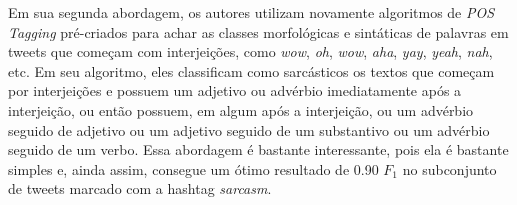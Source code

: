 Em sua segunda abordagem, os autores utilizam novamente algoritmos de
\textit{POS Tagging} pré-criados para achar as classes morfológicas e sintáticas
de palavras em tweets que começam com interjeições, como \textit{wow},
\textit{oh}, \textit{wow}, \textit{aha}, \textit{yay}, \textit{yeah},
\textit{nah}, etc. Em seu algoritmo, eles classificam como sarcásticos os textos
que começam por interjeições e possuem um adjetivo ou advérbio imediatamente
após a interjeição, ou então possuem, em algum após a interjeição, ou um
advérbio seguido de adjetivo ou um adjetivo seguido de um substantivo ou um
advérbio seguido de um verbo. Essa abordagem é bastante interessante, pois ela é
bastante simples e, ainda assim, consegue um ótimo resultado de 0.90 $F_1$ no
subconjunto de tweets marcado com a hashtag \textit{sarcasm}.
